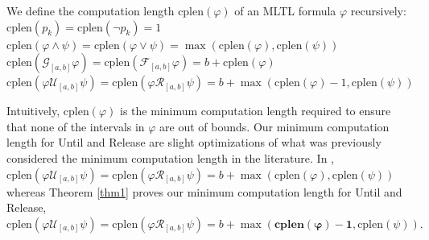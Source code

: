 \documentclass[runningheads]{llncs}
\renewcommand{\phi}{\varphi}
\begin{document}
     
\begin{definition}
We define the computation length $\text{cplen}(\phi)$ of an MLTL formula $\phi$ recursively:\\
\indent \qquad   $\text{cplen}(p_k) = \text{cplen}(\neg p_k) = 1$\\
\indent \qquad   $\text{cplen}(\phi \land \psi) = \text{cplen}(\phi \lor \psi) = \max(\text{cplen}(\phi), \text{cplen}(\psi))$\\
\indent \qquad   $\text{cplen}(\mathcal{G}_{[a,b]} \phi) = \text{cplen}(\mathcal{F}_{[a,b]} \phi) = b + \text{cplen}(\phi)$\\
\indent \qquad   $\text{cplen}(\phi \mathcal{U}_{[a,b]} \psi) = \text{cplen}(\phi \mathcal{R}_{[a,b]} \psi) = b + \max(\text{cplen}(\phi)-1, \text{cplen}(\psi))$
\end{definition}
\vspace{-0.1in}
Intuitively, $\text{cplen}(\phi)$ is the minimum computation length required to ensure that none of the intervals in $\phi$ are out of bounds.
Our minimum computation length for Until and Release are slight optimizations of what was previously considered the minimum computation length in the literature. In \cite{KZJZR20},\\
\indent $\text{cplen}(\phi \mathcal{U}_{[a,b]} \psi) = \text{cplen}(\phi \mathcal{R}_{[a,b]} \psi) = b + \max(\text{cplen}(\phi), \text{cplen}(\psi))$ \\ 
\noindent whereas Theorem \ref{thm1} proves our minimum computation length for Until and Release, \\
\indent $\text{cplen}(\phi \mathcal{U}_{[a,b]} \psi) = \text{cplen}(\phi \mathcal{R}_{[a,b]} \psi) = b + \max(\mathbf{\text{cplen}(\phi)-1}, \text{cplen}(\psi)).$
\end{document}
